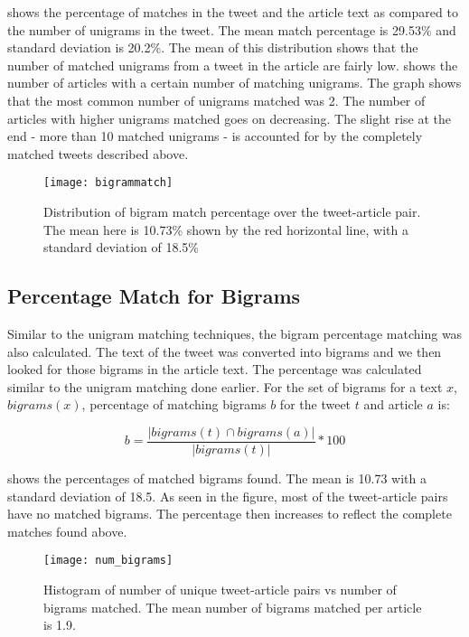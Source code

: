  shows the percentage of matches in the tweet and the article text as compared to the number of unigrams in the tweet. The mean match percentage is 29.53\% and standard deviation is 20.2\%. The mean of this distribution shows that the number of matched unigrams from a tweet in the article are fairly low.  shows the number of articles with a certain number of matching unigrams. The graph shows that the most common number of unigrams matched was 2. The number of articles with higher unigrams matched goes on decreasing. The slight rise at the end - more than 10 matched unigrams - is accounted for by the completely matched tweets described above.

\begin{figure}[tbp]
\centering
\texttt{[image: bigrammatch]}
\caption{Distribution of bigram match percentage over the tweet-article pair. The mean here is 10.73\% shown by the red horizontal line, with a standard deviation of 18.5\%}
\label{fig:bigrammatch}
\end{figure}


\subsection{Percentage Match for Bigrams}
\label{sec:bigrams}

Similar to the unigram matching techniques, the bigram percentage matching was also calculated. The text of the tweet was converted into bigrams and we then looked for those bigrams in the article text. The percentage was calculated similar to the unigram matching done earlier. For the set of bigrams for a text $x$, $\textit{bigrams}(x)$, percentage of matching bigrams $b$ for the tweet $t$ and article $a$ is: 

\begin{equation}
b = \frac{| bigrams(t) \cap bigrams(a) |}{| bigrams(t) |} * 100
\end{equation}

 shows the percentages of matched bigrams found. The mean is 10.73 with a standard deviation of 18.5. As seen in the figure, most of the tweet-article pairs have no matched bigrams. The percentage then increases to reflect the complete matches found above.

\begin{figure}[tbp]
\centering
\texttt{[image: num\_bigrams]}
\caption{Histogram of number of unique tweet-article pairs vs number of bigrams matched. The mean number of bigrams matched per article is 1.9.}
\label{fig:num_bigrams}
\end{figure}

